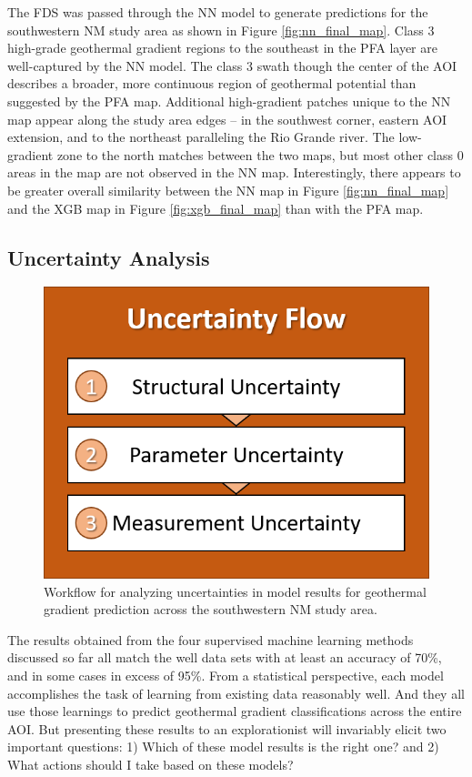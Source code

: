 The FDS was passed through the NN model to generate predictions for the southwestern NM study area as shown in Figure \ref{fig:nn_final_map}. Class 3 high-grade geothermal gradient regions to the southeast in the \citet{bielicki_hydrogeolgic_2015} PFA layer are well-captured by the NN model. The class 3 swath though the center of the AOI describes a broader, more continuous region of geothermal potential than suggested by the PFA map. Additional high-gradient patches unique to the NN map appear along the study area edges – in the southwest corner, eastern AOI extension, and to the northeast paralleling the Rio Grande river. The low-gradient zone to the north matches between the two maps, but most other class 0 areas in the \citeauthor{bielicki_hydrogeolgic_2015} map are not observed in the NN map. Interestingly, there appears to be greater overall similarity between the NN map in Figure \ref{fig:nn_final_map} and the XGB map in Figure \ref{fig:xgb_final_map} than with the PFA map.

\newpage 
\subsection{Uncertainty Analysis}

\begin{figure}
\centering
\includegraphics[width=.4\textwidth]{templates/images/Flow-Uncertainty.png}
\singlespacing
\caption[Uncertainty analysis workflow]{Workflow for analyzing uncertainties in model results for geothermal gradient prediction across the southwestern NM study area.}
\label{fig:uncertainty_flow}
\end{figure}

The results obtained from the four supervised machine learning methods discussed so far all match the well data sets with at least an accuracy of 70\%, and in some cases in excess of 95\%. From a statistical perspective, each model accomplishes the task of learning from existing data reasonably well. And they all use those learnings to predict geothermal gradient classifications across the entire AOI. But presenting these results to an explorationist will invariably elicit two important questions: 1) Which of these model results is the right one? and 2) What actions should I take based on these models? 

